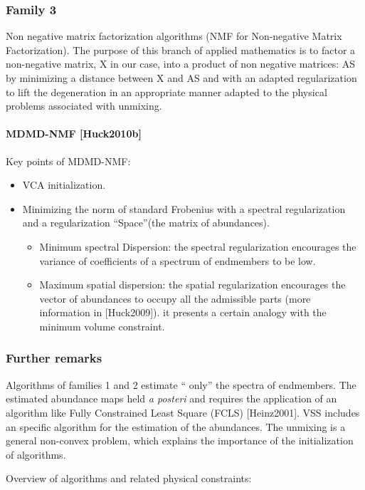 \subsubsection{Family 3}
Non negative matrix factorization algorithms (NMF for Non-negative Matrix Factorization). The purpose of this
branch of applied mathematics is to factor a non-negative matrix, X in our case, into a product of non negative matrices: AS by minimizing a distance between X and AS and
with an adapted regularization to lift the degeneration in an appropriate manner adapted to the physical problems associated with unmixing.

\paragraph{MDMD-NMF [Huck2010b]} 
Key points of MDMD-NMF:
\begin{itemize}
\item {VCA initialization.}
\item {Minimizing the norm of standard
Frobenius with a spectral regularization and a regularization ``Space''(the matrix of abundances).}
\begin{itemize}
\item {Minimum spectral
Dispersion: the spectral regularization encourages the  variance of 
coefficients of a spectrum of endmembers to be low.}
\item {Maximum spatial dispersion: the spatial regularization
  encourages the vector of abundances to occupy all the admissible parts (more information in [Huck2009]). it
  presents a certain analogy with the minimum volume constraint.}
\end{itemize}
\end{itemize}
 
 
  

\subsubsection{Further remarks}
Algorithms of families 1 and 2 estimate `` only'' the spectra of
endmembers. The estimated abundance maps held
\textit{a posteri} and requires the application of an algorithm like Fully
Constrained Least Square (FCLS) [Heinz2001]. VSS includes an specific algorithm
for the estimation of the abundances.
The unmixing is a general non-convex problem,
which explains the importance of the initialization of algorithms.

Overview of algorithms and related physical constraints:

